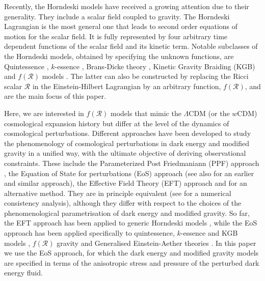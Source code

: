 \documentclass[nofootinbib,a4paper,aps,prd,10pt,superscriptaddress,reprint,showkeys,showpacs]{revtex4-1}
\begin{document}
Recently, the Horndeski models \citep{Horndeski1974,Deffayet2011,Kobayashi2011} have received a growing attention due 
to their generality. They include a scalar field coupled to gravity. The Horndeski Lagrangian is the most general one 
that leads to second order equations of motion for the scalar field. It is fully represented by four arbitrary time 
dependent functions of the scalar field and its kinetic term. 
Notable subclasses of the Horndeski models, obtained by specifying the unknown functions, are Quintessence 
\citep{Ford1987,Peebles1988,Ratra1988a,Wetterich1988,Caldwell1998,Copeland1998,Steinhardt1999,Barreiro2000}, 
$k$-essence \citep{ArmendarizPicon1999,Chiba2000,Hamed2004,Piazza2004,Scherrer2004,Mukhanov2006}, Brans-Dicke theory 
\citep{Brans1961,DeFelice2010a}, Kinetic Gravity Braiding (KGB) \citep{Deffayet2010,Pujolas2011} and $f(\mathcal{R})$ 
models \citep{Song2007,Silvestri2009,Sotiriou2010,DeFelice2010}. 
The latter can also be constructed by replacing the Ricci scalar $\mathcal{R}$ in the Einstein-Hilbert Lagrangian by an 
arbitrary function, $f(\mathcal{R})$, and are the main focus of this paper.

Here, we are interested in $f(\mathcal{R})$ models that mimic the $\Lambda$CDM (or the $w$CDM) cosmological expansion 
history but differ at the level of the dynamics of cosmological perturbations. Different approaches have been 
developed to study the phenomenology of cosmological perturbations in dark energy and modified gravity in a unified 
way, with the ultimate objective of deriving observational constraints. These include the Parameterized Post 
Friedmaniann (PPF) approach \citep{Skordis2009a,Baker2011,Baker2013,Ferreira2014}, the Equation of State for 
perturbations (EoS) approach \citep{Battye2012,Battye2013,Battye2014} (see also \citep{Kunz2007} for an earlier and 
similar approach), the Effective Field Theory (EFT) approach 
\citep{Bloomfield2013a,Bloomfield2013b,Gleyzes2013,Gleyzes2014,Gleyzes2015} and \cite{Bertacca2012} for an alternative 
method. 
They are in principle equivalent (see \citep{Bellini2018} for a numerical consistency analysis), although they differ 
with respect to the choices of the phenomenological parametrisation of dark energy and modified gravity. 
So far, the EFT approach has been applied to generic Horndeski models \citep{Gleyzes2013,Gleyzes2014}, while the EoS 
approach has been applied specifically to quintessence, $k$-essence and KGB models \citep{Battye2014}, $f(\mathcal{R})$ 
gravity \citep{Battye2016a} and Generalised Einstein-Aether theories \citep{Battye2017}. In this paper we use the EoS 
approach, for which the dark energy and modified gravity models are specified in terms of the anisotropic stress and 
pressure of the perturbed dark energy fluid.
\end{document}
